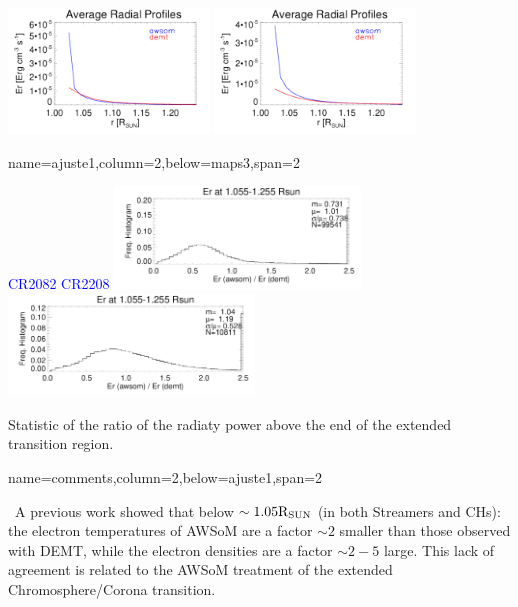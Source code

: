 \documentclass[paperwidth=100cm,paperheight=120cm]{baposter}
\def\bu{\textcolor{red}{\textbullet~}}
\def\bu{\textcolor{red}{\textbullet~}}
\def\azul#1{\textcolor{blue}{#1}}
\begin{document}
\begin{poster}
{{\begin{center}
{\includegraphics[width=0.4\textwidth]{Average_Radial_Profiles_Er_awsom_vs_demt_H_cr2082_ratio_streamer.pdf}}
{\includegraphics[width=0.4\textwidth]{Average_Radial_Profiles_Er_awsom_vs_demt_H_cr2208_ratio_streamer.pdf}}\\
\end{center}
\vskip -0.16cm

}
}

{name=ajuste1,column=2,below=maps3,span=2}{
{\footnotesize\sf
\begin{center}
\azul{\hskip 3.5cm CR2082 \hfill CR2208 \hskip 3.0cm}
{\includegraphics[width=0.49\textwidth]{comparison_Er_awsom_vs_demt_H_cr2082_ratio_streamer_ratio_range1055-1250_Rsun.pdf}}
{\includegraphics[width=0.49\textwidth]{comparison_Er_awsom_vs_demt_H_cr2208_ratio_streamer_ratio_range1055-1250_Rsun.pdf}}\\
\end{center}
Statistic of the ratio of the radiaty power above the end of the extended transition region.
}
}
{name=comments,column=2,below=ajuste1,span=2}{
{\footnotesize\sf
\bu A previous work showed that below $\sim 1.05 {\rm R_{SUN}}$ (in both Streamers and CHs): the electron temperatures of AWSoM are a factor $\sim 2$ smaller than those observed with DEMT, while the electron densities are a factor $\sim 2-5$ large. This lack of agreement is related to the AWSoM treatment of the extended Chromosphere/Corona transition.

}}
\end{poster}
\end{document}
